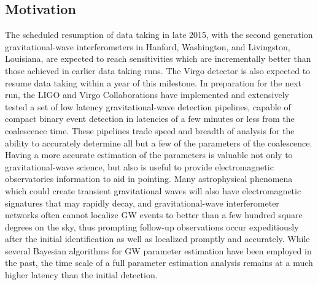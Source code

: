 \subsection{Motivation}

The scheduled resumption of data taking in late 2015\cite{observingdocument}, with the second generation gravitational-wave interferometers in Hanford, Washington, and Livingston, Louisiana, are expected to reach sensitivities which are incrementally better than those achieved in earlier data taking runs\cite{s5s6}. The Virgo detector is also expected to resume data taking within a year of this milestone. In preparation for the next run, the LIGO and Virgo Collaborations have implemented and extensively tested a set of low latency gravitational-wave detection pipelines\cite{gstlal,mbta,cwb}, capable of compact binary event detection in latencies of a few minutes or less from the coalescence time. These pipelines trade speed and breadth of analysis for the ability to accurately determine all but a few of the parameters of the coalescence. Having a more accurate estimation of the parameters is valuable not only to gravitational-wave science, but also is useful to provide electromagnetic observatories information to aid in pointing. Many astrophysical phenomena which could create transient gravitational waves will also have electromagnetic signatures that may rapidly decay, and gravitational-wave interferometer networks often cannot localize GW events to better than a few hundred square degrees on the sky\cite{skylocpapers}, thus prompting follow-up observations occur expeditiously after the initial identification as well as localized promptly and accurately. While several Bayesian algorithms for GW parameter estimation have been employed in the past, the time scale of a full parameter estimation analysis remains at a much higher latency than the initial detection.

